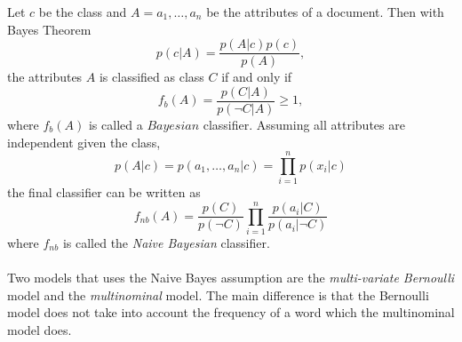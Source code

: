 Let $c$ be the class and $A = a_1, \dots ,a_n$ be the attributes of a document. Then with Bayes Theorem
\begin{equation}
p(c|A)=\frac{p(A|c)p(c)}{p(A)},
\end{equation}
the attributes $A$ is classified as class $C$ if and only if
\begin{equation}
f_b(A)=\frac{p(C|A)}{p(\neg C|A)} \geq 1,
\end{equation}
where $f_b(A)$ is called a $Bayesian$ classifier. Assuming all attributes are independent given the class, 
\[
p(A|c)=p(a_1,\dots ,a_n | c) = \prod_{i=1}^n p(x_i|c)
\]
the final classifier can be written as
\begin{equation}
f_{nb}(A) = \frac{p(C)}{p(\neg C)}\prod_{i=1}^n\frac{p(a_i|C)}{p(a_i|\neg C)}
\end{equation}
where $f_{nb}$ is called the \emph{Naive Bayesian} classifier.\\\\
Two models that uses the Naive Bayes assumption are the \emph{multi-variate Bernoulli} model and the \emph{multinominal} model. The main difference is that the Bernoulli model does not take into account the frequency of a word which the multinominal model does.